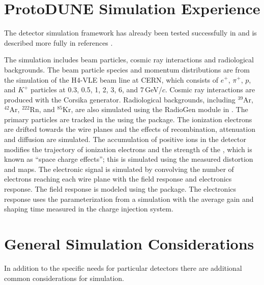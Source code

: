 \documentclass[../main-v1.tex]{subfiles}
\begin{document}
\section{ProtoDUNE Simulation Experience }

The detector simulation framework has already been tested successfully in  and is described more fully in references \cite{DUNE:2021hwx,DUNE:2020cqd}.

The  simulation includes beam particles, cosmic ray interactions and radiological backgrounds. The beam particle species and momentum distributions are from the  simulation of the H4-VLE beam line at CERN, which consists of $e^{+}$, $\pi^{+}$, $p$, and $K^{+}$ particles at 0.3, 0.5, 1, 2, 3, 6, and 7\,GeV/$c$. Cosmic ray interactions are produced with the Corsika generator. Radiological backgrounds, including $^{39}$Ar, $^{42}$Ar, $^{222}$Rn, and $^{85}$Kr, are also simulated using the RadioGen module in . The primary particles are tracked in the  using the  package. 
The ionization electrons are drifted towards the wire planes %
and the effects of recombination, attenuation and diffusion are simulated. The accumulation of positive ions in the detector modifies the trajectory of ionization electrons and the strength of the \efield, which is 
known as ``space charge effects''; this is simulated using the measured distortion and \efield maps. The electronic signal is simulated by convolving the number of electrons reaching each wire plane with the field response and electronics response. The field response is modeled using the \cite{Veenhof:1998tt} package. 
The electronics response uses the parameterization from a  simulation with the average gain and shaping time measured in the  charge injection system. 
\section{General Simulation Considerations}

In addition to the specific needs for particular detectors there are additional common considerations for simulation. 
\end{document}
